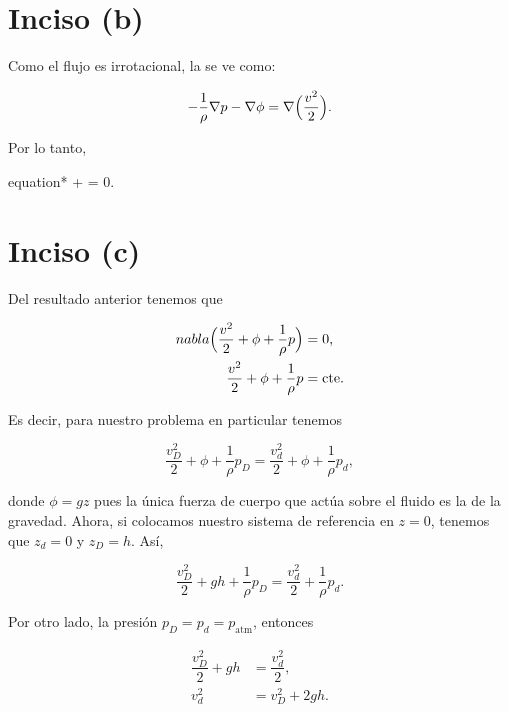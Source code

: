 \documentclass[../main.tex]{subfiles}
\begin{document}
\begin{problema}
	\section*{Inciso (b)}

	Como el flujo es irrotacional, la se ve como:

	\begin{equation*}
		-\dfrac{1}{\rho}\nabla{p} - \nabla{\phi} = \nabla{\Bigl(\dfrac{v^{2}}{2}\Bigr)}.
	\end{equation*}

	Por lo tanto,

	\begin{empheq}[box = \mainresult]{equation*}
		 +  = 0.
	\end{empheq}

	\section*{Inciso (c)}

	Del resultado anterior tenemos que

	\begin{align*}
		nabla{\Bigl(\dfrac{v^{2}}{2} + \phi + \dfrac{1}{\rho}p\Bigr)} & = 0,          \\
		\dfrac{v^{2}}{2} + \phi + \dfrac{1}{\rho}p                    & = \text{cte.}
	\end{align*}

	Es decir, para nuestro problema en particular tenemos

	\begin{equation*}
		\dfrac{v_{D}^{2}}{2} + \phi + \dfrac{1}{\rho}p_{D} = \dfrac{v_{d}^{2}}{2} + \phi + \dfrac{1}{\rho}p_{d},
	\end{equation*}

	donde \(\phi = gz\) pues la única fuerza de cuerpo que actúa sobre el fluido es la
	de la gravedad. Ahora, si colocamos nuestro sistema de referencia en \(z = 0\),
	tenemos que \(z_{d} = 0\) y \(z_{D} = h\). Así,

	\begin{equation*}
		\dfrac{v_{D}^{2}}{2} + gh + \dfrac{1}{\rho}p_{D} = \dfrac{v_{d}^{2}}{2} + \dfrac{1}{\rho}p_{d}.
	\end{equation*}

	Por otro lado, la presión \(p_{D} = p_{d} = p_{\text{atm}}\), entonces

	\begin{align}
		\dfrac{v_{D}^{2}}{2} + gh & = \dfrac{v_{d}^{2}}{2},\nonumber              \\
		v_{d}^{2}                 & = v_{D}^{2} + 2gh.\label{eq:velocidad-salida}
	\end{align}


\end{problema}
\end{document}
